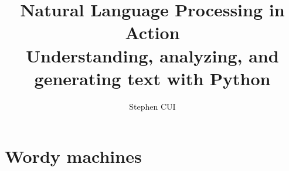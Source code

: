 \documentclass[openany]{book}
\title{\textbf{Natural Language Processing in Action}\\
Understanding, analyzing, and generating text with Python
}
\author{Stephen CUI}
\begin{document}
\maketitle
\part{Wordy machines}

\end{document}

